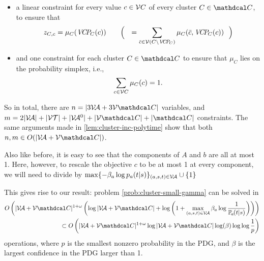 \documentclass{article}
\begin{document}
\begin{lproof}
\begin{itemize}[label=$\blacktriangleright$]
\begin{itemize}[label=\textbullet]

             
            \item a linear constraint for every value $c \in \mathcal V C$ of every cluster $C \in \C$, to ensure that
            \[
                z_{C,c} = \mu_C( \Pash_C(c) )
                    \qquad \Big(~~= \sum_{\bar c \in \V(C \setminus \Pash_C)}
                        \mu_{C}(\bar c, \Pash_C(c)) ~~\Big)
            \]
            \item and one constraint for each cluster $C \in \C$ to ensure that $\mu_{C}$ lies on the probability simplex, i.e.,
            \[
                \sum_{c \in \mathcal V C} \mu_C(c) = 1.
            \]
        \end{itemize}
    \end{itemize}
    So in total, there are 
    $n = |3 \V \!\Ar + 3 \V \C|$ variables,
    and 
    $m = 2 |\V\!\Ar| + |\V \mathcal T| + |\V\!\Ar^0| + |\V \C| + |\C|$ constraints. 
    The same arguments made in \cref{lem:cluster-inc-polytime} show that both $n,m \in O(|\V \!\Ar + \V \C|)$.
    
    Also like before, it is easy to see that the components of $A$ and $b$ are all at most 1.  Here, however, to rescale the objective $c$ to be at most 1 at every component, we will need to divide by 
    $\max \{ - \beta_a \log {p_a(t|s)} \}_{(a,s,t) \in \mathcal V\!\mathcal A} \cup \{ 1 \}$
    
    This gives rise to our result: problem \eqref{prob:cluster-small-gamma} can be solved in 
    \begin{align*}
        O\left( |\V \!\Ar + \V \C|^{1+\omega} 
            \left(\log |\V \!\Ar + \V \C| + \log\left(1 + \max_{(a,s,t) \in \V\!\Ar} \beta_a \log \frac{1}{\p_a(t|s)} \right) \right)  \right) \\
        \subset 
        O\left( |\V \!\Ar + \V \C|^{1+ \omega} 
            \log |\V \!\Ar + \V \C|
            \log (\beta ) \log\log \frac{1}{p} \right)
    \end{align*}
    operations, where $p$ is the smallest nonzero probability in the PDG, and $\beta$ is the largest confidence in the PDG larger than 1.
\end{lproof}
\end{document}
